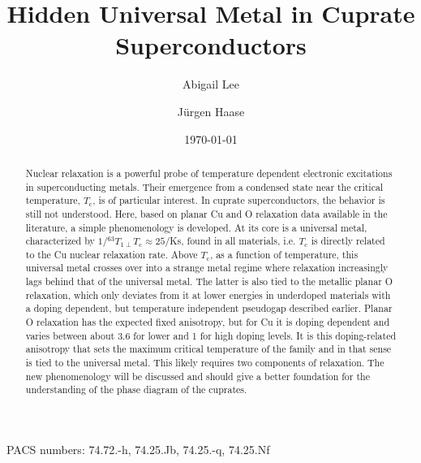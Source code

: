 \documentclass[preprint,superscriptaddress,amsmath,amssymb,aps,physrev,prb,floatfix, fleqn]{revtex4-2} \usepackage{bm} %
\begin{document}
\title{\textbf{Hidden Universal Metal in Cuprate Superconductors}}
\author{Abigail Lee}
\author{Jürgen Haase}

\date{\today}
\medskip


\begin{abstract}
\vspace{1cm}
{Nuclear relaxation is a powerful probe of temperature dependent electronic excitations in superconducting metals. Their emergence from a condensed state near the critical temperature, $T_\mathrm{c}$, is of particular interest. In cuprate superconductors, the behavior is still not understood. Here, based on planar Cu and O relaxation data available in the literature, a simple phenomenology is developed. At its core is a universal metal, characterized by $1/{^{63}T}_{1\perp} T_\mathrm{c} \approx 25$/Ks, found in all materials, i.e. $T_\mathrm{c}$ is directly related to the Cu nuclear relaxation rate. Above $T_\mathrm{c}$, as a function of temperature, this universal metal crosses over into a strange metal regime where relaxation increasingly lags behind that of the universal metal. The latter is also tied to the metallic planar O relaxation, which only deviates from it at lower energies in underdoped materials with a doping dependent, but temperature independent pseudogap described earlier. Planar O relaxation has the expected fixed anisotropy, but for Cu it is doping dependent and varies between about 3.6 for lower and 1 for high doping levels. It is this doping-related anisotropy that sets the maximum critical temperature of the family and in that sense is tied to the universal metal. This likely requires two components of relaxation. The new phenomenology will be discussed and should give a better foundation for the understanding of the phase diagram of the cuprates.}
\end{abstract}

{\flushleft PACS numbers:  74.72.-h, 74.25.Jb, 74.25.-q, 74.25.Nf}\\


\maketitle
\end{document}
